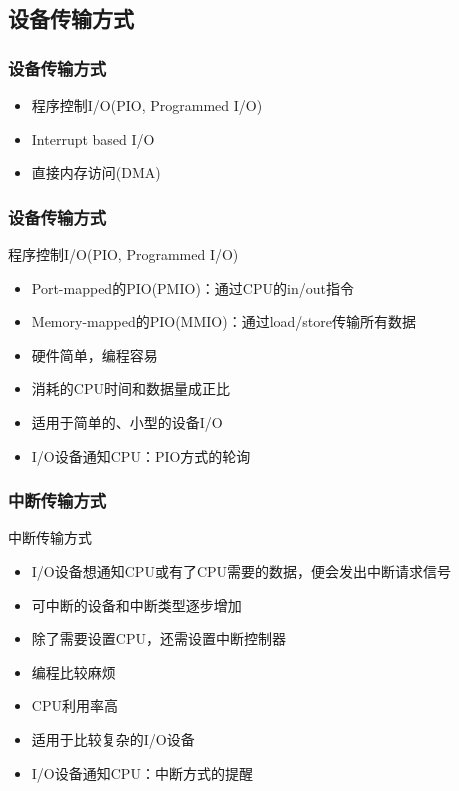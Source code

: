 \subsection{设备传输方式} %
\begin{frame}[fragile]
    \frametitle{设备传输方式}
        \begin{itemize}
            \item 程序控制I/O(PIO, Programmed I/O)
            \item Interrupt based I/O
            \item 直接内存访问(DMA)
        \end{itemize}
\end{frame}
\begin{frame}[fragile]
    \frametitle{设备传输方式}
    程序控制I/O(PIO, Programmed I/O)
    \begin{itemize}
        \item Port-mapped的PIO(PMIO)：通过CPU的in/out指令
        \item Memory-mapped的PIO(MMIO)：通过load/store传输所有数据
        \item 硬件简单，编程容易
        \item 消耗的CPU时间和数据量成正比
        \item 适用于简单的、小型的设备I/O
        \item I/O设备通知CPU：PIO方式的轮询
    \end{itemize}
\end{frame}
\begin{frame}[fragile]
    \frametitle{中断传输方式}
    中断传输方式
    \begin{itemize}
        \item I/O设备想通知CPU或有了CPU需要的数据，便会发出中断请求信号
        \item 可中断的设备和中断类型逐步增加
        \item 除了需要设置CPU，还需设置中断控制器
        \item 编程比较麻烦
        \item CPU利用率高
        \item 适用于比较复杂的I/O设备
        \item I/O设备通知CPU：中断方式的提醒
    \end{itemize}
\end{frame}

